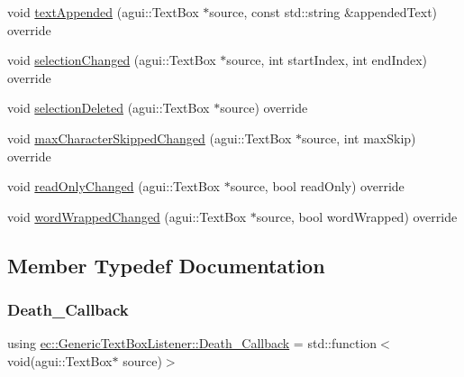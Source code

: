\begin{DoxyCompactItemize}
\item 
void \mbox{\hyperlink{classec_1_1_generic_text_box_listener_a719c94c960a53eb5cac8c18b037ad505}{text\+Appended}} (agui\+::\+Text\+Box $\ast$source, const std\+::string \&appended\+Text) override
\item 
void \mbox{\hyperlink{classec_1_1_generic_text_box_listener_aa9446926f03c32f34212232ec81809a5}{selection\+Changed}} (agui\+::\+Text\+Box $\ast$source, int start\+Index, int end\+Index) override
\item 
void \mbox{\hyperlink{classec_1_1_generic_text_box_listener_a5f1b7490ad657f39a2a1d6270446482e}{selection\+Deleted}} (agui\+::\+Text\+Box $\ast$source) override
\item 
void \mbox{\hyperlink{classec_1_1_generic_text_box_listener_aea1d18f7bda91591408fc0408ff04284}{max\+Character\+Skipped\+Changed}} (agui\+::\+Text\+Box $\ast$source, int max\+Skip) override
\item 
void \mbox{\hyperlink{classec_1_1_generic_text_box_listener_a90daf3b875c097cd53bbf2c8b83558e3}{read\+Only\+Changed}} (agui\+::\+Text\+Box $\ast$source, bool read\+Only) override
\item 
void \mbox{\hyperlink{classec_1_1_generic_text_box_listener_a96cdc8f0e3932f1cfbe2fd6888818452}{word\+Wrapped\+Changed}} (agui\+::\+Text\+Box $\ast$source, bool word\+Wrapped) override
\end{DoxyCompactItemize}


\subsection{Member Typedef Documentation}
\mbox{\label{classec_1_1_generic_text_box_listener_acef5d6f448ba7f8a90e56deed9e4be68}} 
\subsubsection{\texorpdfstring{Death\+\_\+\+Callback}{Death\_Callback}}
{\footnotesize\ttfamily using \mbox{\hyperlink{classec_1_1_generic_text_box_listener_acef5d6f448ba7f8a90e56deed9e4be68}{ec\+::\+Generic\+Text\+Box\+Listener\+::\+Death\+\_\+\+Callback}} =  std\+::function$<$void(agui\+::\+Text\+Box$\ast$ source)$>$}

